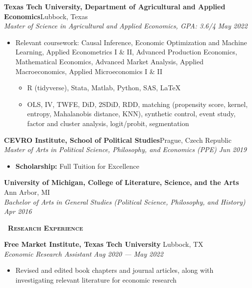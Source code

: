 \documentclass[a4paper,12pt]{article}
\newcommand{\header} [1] {
    \vspace{1mm}
    {\textsc{\textbf{\Large{\xrfill[0.5ex]{0.5pt}~#1~\xrfill[0.5ex]{0.5pt}}}}} %
    \vspace{1mm}
}
\begin{document}
\vspace{1mm}
\textbf{Texas Tech University, Department of Agricultural and Applied Economics}\hfill Lubbock, Texas\\
\textit{Master of Science in Agricultural and Applied Economics, GPA: 3.6/4} \hfill  \textit{May 2022}
\begin{itemize}
    \item Relevant coursework: Causal Inference, Economic Optimization and Machine Learning, Applied Econometrics I \& II, Advanced Production Economics, Mathematical Economics, Advanced Market Analysis, Applied Macroeconomics, Applied Microeconomics I \& II
    \begin{itemize}
        \item R (tidyverse), Stata, Matlab, Python, SAS, \LaTeX
        \item OLS, IV, TWFE, DiD, 2SDiD, RDD, matching (propensity score, kernel, entropy, Mahalanobis distance,  KNN), synthetic control, event study, factor and cluster analysis, logit/probit, segmentation
    \end{itemize}
\end{itemize}
\vspace{1mm}
\textbf{CEVRO Institute, School of Political Studies}\hfill Prague, Czech Republic \\
\textit{Master of Arts in Political Science, Philosophy, and Economics (PPE)} \hfill  \textit{Jun 2019}
\begin{itemize}
    \item \textbf{Scholarship:} Full Tuition for Excellence
\end{itemize}
\vspace{1mm}
\textbf{University of Michigan, College of Literature, Science, and the Arts} \hfill Ann Arbor, MI\\
\textit{Bachelor of Arts in General Studies (Political Science, Philosophy, and History)} \hfill  \textit{Apr 2016}

\vspace{1mm}
\header{Research Experience} 

\vspace{1mm}
\textbf{Free Market Institute, Texas Tech University} \hfill Lubbock, TX\\
\textit{Economic Research Assistant} \hfill  \textit{Aug 2020 --- May 2022} 
\begin{itemize}
    \item Revised and edited book chapters and journal articles, along with investigating relevant literature for economic research
\end{itemize}
\vspace{1mm}
\end{document}
